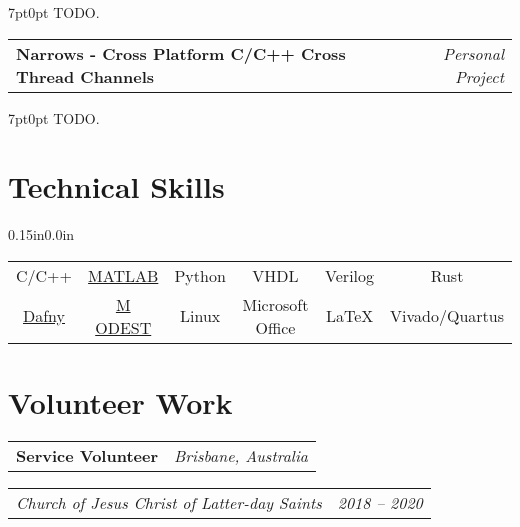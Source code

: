 \documentclass[letterpaper,12pt]{article}
\makeatletter
\def\fakesc#1{%
  \begingroup%
  \xdef\fake@name{\csname\curr@fontshape/\f@size\endcsname}%
  \fontsize{\fontdimen8\fake@name}{\baselineskip}\selectfont%
  \uppercase{#1}%
  \endgroup%
}
\newcommand{\simpleHeading}[2]{
    \vspace{-1pt}
    \begin{tabular*}{0.99\textwidth}[t]{l@{\extracolsep{\fill}}r}
        #1 & #2 \\
    \end{tabular*}
}
\newcommand{\positionHeading}[4]{
    \simpleHeading{\textbf{#1}}{\textit{#2}}
    \simpleHeading{\textit{#3}}{\textit{#4}}
}
\newcommand{\simpleParagraph}[1]{
    \vspace{-1pt}
    \begin{adjustwidth}{7pt}{0pt}
        #1
    \end{adjustwidth}
}
\makeatother
\begin{document}
    \simpleParagraph{TODO.}
    

    \vspace{10pt}
    \simpleHeading{\textbf{Narrows - Cross Platform C/C++ Cross Thread Channels}}{\textit{Personal Project}}

    \simpleParagraph{TODO.}


\section{Technical Skills}
  \begin{adjustwidth}{0.15in}{0.0in}
    \begin{tabular*}{0.97\linewidth}{@{\extracolsep{\fill}} cccccc }
        C/C++
            & \href{https://www.mathworks.com/products/matlab.html}{MATLAB}
            & Python & VHDL & Verilog & Rust \\
        \href{https://dafny.org/}{Dafny}
            & \href{https://www.modestchecker.net/}{M\fakesc{odest}}
            & Linux & Microsoft Office & \LaTeX & Vivado/Quartus \\
    \end{tabular*}
  \end{adjustwidth}


\section{Volunteer Work}
    \positionHeading{Service Volunteer}{Brisbane, Australia}
        {Church of Jesus Christ of Latter-day Saints}{2018 -- 2020}




\end{document}
